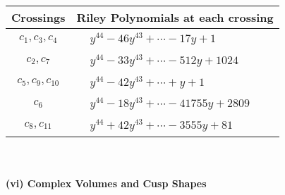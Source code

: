 \documentclass[1p]{elsarticle_modified}
\theoremstyle{definition}
\begin{document}
\begin{tabular}{m{50pt}|m{274pt}}
Crossings & \hspace{64pt}Riley Polynomials at each crossing \\
\hline $$\begin{aligned}c_{1},c_{3},c_{4}\end{aligned}$$&$\begin{aligned}
&y^{44}-46 y^{43}+\cdots-17 y+1
\end{aligned}$\\
\hline $$\begin{aligned}c_{2},c_{7}\end{aligned}$$&$\begin{aligned}
&y^{44}-33 y^{43}+\cdots-512 y+1024
\end{aligned}$\\
\hline $$\begin{aligned}c_{5},c_{9},c_{10}\end{aligned}$$&$\begin{aligned}
&y^{44}-42 y^{43}+\cdots+y+1
\end{aligned}$\\
\hline $$\begin{aligned}c_{6}\end{aligned}$$&$\begin{aligned}
&y^{44}-18 y^{43}+\cdots-41755 y+2809
\end{aligned}$\\
\hline $$\begin{aligned}c_{8},c_{11}\end{aligned}$$&$\begin{aligned}
&y^{44}+42 y^{43}+\cdots-3555 y+81
\end{aligned}$\\
\hline
\end{tabular}\\~\\
\newpage\flushleft \textbf{(vi) Complex Volumes and Cusp Shapes}
\end{document}
